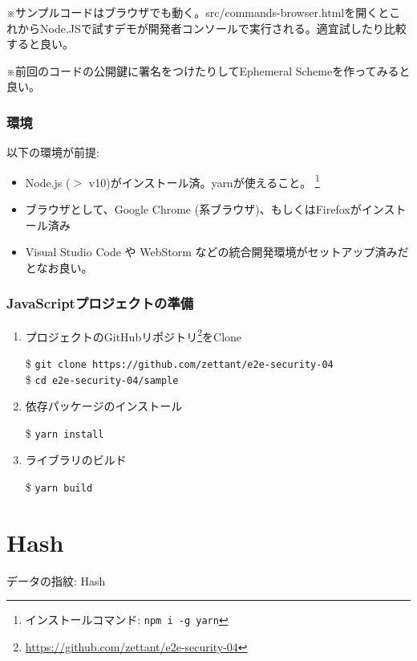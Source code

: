 \documentclass[12pt,dvipdfmx]{beamer}
\begin{document}
\begin{frame}

※\alert{サンプルコードはブラウザでも動く}。src/commands-browser.htmlを開くとこれからNode.JSで試すデモが開発者コンソールで実行される。適宜試したり比較すると良い。

\vspace{2ex}

※前回のコードの公開鍵に署名をつけたりしてEphemeral Schemeを作ってみると良い。
\end{frame}

\begin{frame}
\frametitle{環境}
以下の環境が前提:
\begin{itemize}
 \item Node.js ($>$ v10)がインストール済。yarnが使えること。 \footnote[frame]{インストールコマンド: \texttt{npm i -g yarn}}
 \item ブラウザとして、Google Chrome (系ブラウザ)、もしくはFirefoxがインストール済み
 \item Visual Studio Code や WebStorm などの統合開発環境がセットアップ済みだとなお良い。
\end{itemize}
\end{frame}

\begin{frame}
\frametitle{JavaScriptプロジェクトの準備}
\begin{enumerate}
\item プロジェクトのGitHubリポジトリ\footnote[frame]{\url{https://github.com/zettant/e2e-security-04}}をClone\\
\begin{exampleblock}{}
\footnotesize
\$ \texttt{git clone https://github.com/zettant/e2e-security-04}\\
\$ \texttt{cd e2e-security-04/sample}
\end{exampleblock}
\item 依存パッケージのインストール
\begin{exampleblock}{}
\$ \texttt{yarn install}
\end{exampleblock}
\item ライブラリのビルド
\begin{exampleblock}{}
\$ \texttt{yarn build}
\end{exampleblock}
\end{enumerate}
\end{frame}


\section{Hash}
\begin{frame}
\centering
{\Large データの指紋: Hash}
\end{frame}
\end{document}
